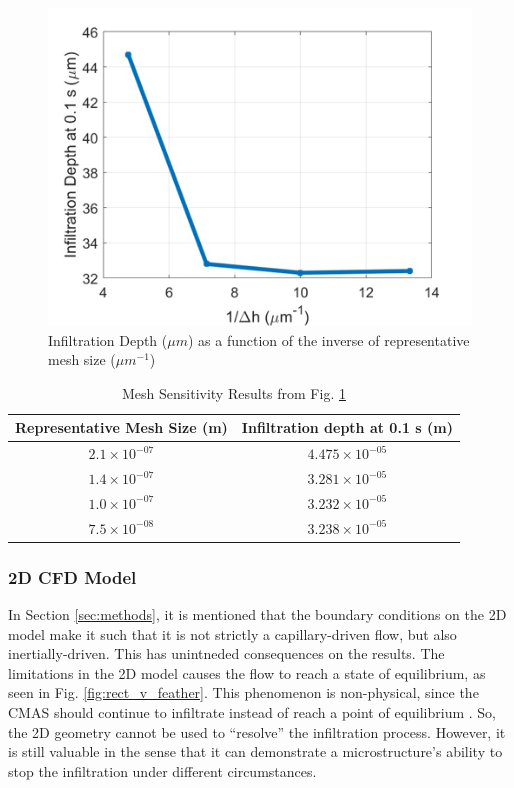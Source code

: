 \documentclass[%
 aip,
 amsmath,amssymb,
 reprint,%
]{revtex4-1}
\begin{document}
\begin{figure}
    \centering
    \includegraphics[width=\linewidth]{Figures/infilDepthMesh.png}
    \caption{Infiltration Depth ($\mu m$) as a function of the inverse of representative mesh size ($\mu m ^{-1}$)}
    \label{fig:meshSensResults}
\end{figure}

\begin{table}[htp!]
    \centering
    \caption{Mesh Sensitivity Results from Fig. \ref{fig:meshSensResults}}
    \begin{tabular}{c|c}
       Representative Mesh Size (m)  & Infiltration depth at 0.1 s (m) \\
       \hline
        $2.1\times10^{-07}$ & $4.475\times10^{-05}$ \\
        $1.4\times10^{-07}$ & $3.281\times10^{-05}$ \\
        $1.0\times10^{-07}$ & $3.232\times10^{-05}$ \\
        $7.5\times10^{-08}$ & $3.238\times10^{-05}$
    \end{tabular}
    \label{tab:meshSensResults}
\end{table}

\subsubsection{2D CFD Model}
In Section \ref{sec:methods}, it is mentioned that the boundary conditions on the 2D model make it such that it is not strictly a capillary-driven flow, but also inertially-driven. This has unintneded consequences on the results. The limitations in the 2D model causes the flow to reach a state of equilibrium, as seen in Fig. \ref{fig:rect_v_feather}. This phenomenon is non-physical, since the CMAS should continue to infiltrate instead of reach a point of equilibrium \cite{Naraparaju2017}. So, the 2D geometry cannot be used to ``resolve'' the infiltration process. However, it is still valuable in the sense that it can demonstrate a microstructure's ability to stop the infiltration under different circumstances.
\end{document}
